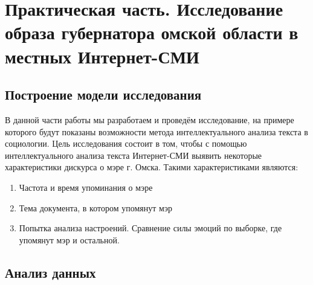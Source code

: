 \chapter{Практическая часть. Исследование образа губернатора омской области в местных Интернет-СМИ} \label{chapt2}
\section{Построение модели исследования} \label{sect2_1}
В данной части работы мы разработаем и проведём исследование, на примере которого будут показаны возможности метода интеллектуального анализа текста в социологии. Цель исследования состоит в том, чтобы с помощью интеллектуального анализа текста Интернет-СМИ выявить некоторые характеристики дискурса о мэре г. Омска. Такими характеристиками являются:
\begin{enumerate}
\item Частота и время упоминания о мэре
\item Тема документа, в котором упомянут мэр 
\item Попытка анализа настроений. Сравнение силы эмоций по выборке, где упомянут мэр и остальной.
\end{enumerate}
\section{Анализ данных} \label{sect2_2}



\clearpage